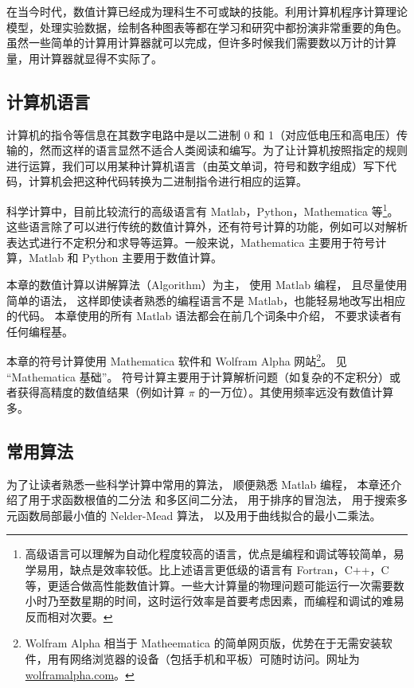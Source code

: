
在当今时代，数值计算已经成为理科生不可或缺的技能。利用计算机程序计算理论模型，处理实验数据，绘制各种图表等都在学习和研究中都扮演非常重要的角色。虽然一些简单的计算用计算器就可以完成，但许多时候我们需要数以万计的计算量，用计算器就显得不实际了。

\subsection{计算机语言}
计算机的指令等信息在其数字电路中是以二进制 0 和 1（对应低电压和高电压）传输的，然而这样的语言显然不适合人类阅读和编写。为了让计算机按照指定的规则进行运算，我们可以用某种计算机语言（由英文单词，符号和数字组成）写下代码，计算机会把这种代码转换为二进制指令进行相应的运算。

科学计算中，目前比较流行的高级语言有 Matlab，Python，Mathematica 等\footnote{高级语言可以理解为自动化程度较高的语言，优点是编程和调试等较简单，易学易用，缺点是效率较低。比上述语言更低级的语言有 Fortran，C++，C 等，更适合做高性能数值计算。一些大计算量的物理问题可能运行一次需要数小时乃至数星期的时间，这时运行效率是首要考虑因素，而编程和调试的难易反而相对次要。}。这些语言除了可以进行传统的数值计算外，还有符号计算的功能，例如可以对解析表达式进行不定积分和求导等运算。一般来说，Mathematica 主要用于符号计算，Matlab 和 Python 主要用于数值计算。

本章的数值计算以讲解算法（Algorithm）为主， 使用 Matlab 编程， 且尽量使用简单的语法， 这样即使读者熟悉的编程语言不是 Matlab，也能轻易地改写出相应的代码。 本章使用的所有 Matlab 语法都会在前几个词条中介绍， 不要求读者有任何编程基。

本章的符号计算使用 Mathematica 软件和 Wolfram Alpha 网站\footnote{Wolfram Alpha 相当于 Matheematica 的简单网页版，优势在于无需安装软件，用有网络浏览器的设备（包括手机和平板）可随时访问。网址为 \href{https://www.wolframalpha.com/}{wolframalpha.com}。}。 见 “Mathematica 基础”。%
符号计算主要用于计算解析问题（如复杂的不定积分）或者获得高精度的数值结果（例如计算 $\pi$ 的一万位）。其使用频率远没有数值计算多。

\subsection{常用算法}
为了让读者熟悉一些科学计算中常用的算法， 顺便熟悉 Matlab 编程， 本章还介绍了用于求函数根值的二分法 和多区间二分法， 用于排序的冒泡法， 用于搜索多元函数局部最小值的 Nelder-Mead 算法， 以及用于曲线拟合的最小二乘法。%

